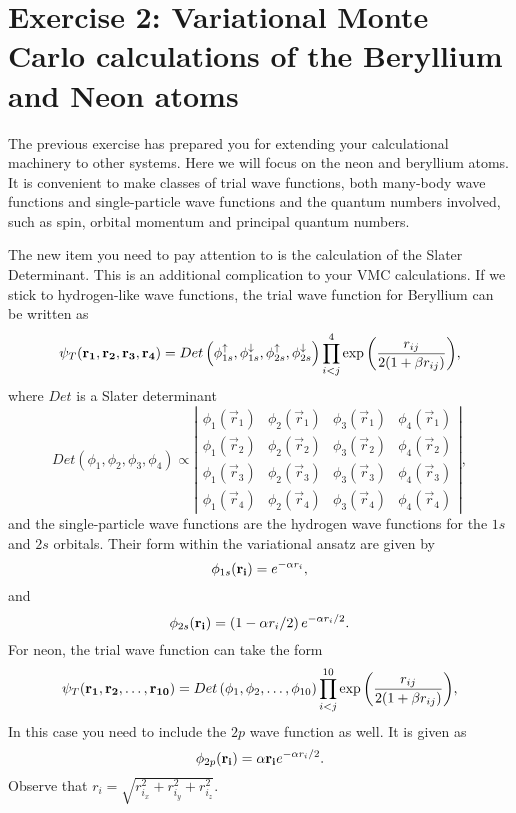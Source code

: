 
\section*{Exercise 2: Variational Monte Carlo calculations of the Beryllium and  Neon atoms}
The previous exercise has prepared you for extending your calculational machinery to other systems. Here we will focus on the neon and beryllium atoms. It is convenient to make classes of trial wave functions, both many-body wave functions and single-particle wave functions and the quantum numbers involved, such as spin, orbital momentum and principal quantum numbers.

The new item you need to pay attention to is the calculation of the Slater Determinant. This is an additional complication to your VMC calculations. If we stick to hydrogen-like wave functions, the trial wave function for Beryllium can be written as 
\begin{equation}
   \psi_{T}({\bf r_1},{\bf r_2}, {\bf r_3}, {\bf r_4}) = 
   Det\left(
   \phi_{1s}^\uparrow, \phi_{1s}^\downarrow,
   \phi_{2s}^\uparrow, \phi_{2s}^\downarrow
   \right)
   \prod_{i<j}^{4}\exp{\left(\frac{r_{ij}}{2(1+\beta r_{ij})}\right)}, 
\end{equation}
where $Det$ is a Slater determinant
\begin{equation}
   Det\left(
   \phi_{1}, \phi_{2},
   \phi_{3}, \phi_{4}
   \right)
    \propto 
    \left| \begin{matrix} 
      \phi_1(\vec{r}_1) & \phi_2(\vec{r}_1) & \phi_3(\vec{r}_1) & \phi_4(\vec{r}_1) \\ 
      \phi_1(\vec{r}_2) & \phi_2(\vec{r}_2) & \phi_3(\vec{r}_2) & \phi_4(\vec{r}_2) \\ 
      \phi_1(\vec{r}_3) & \phi_2(\vec{r}_3) & \phi_3(\vec{r}_3) & \phi_4(\vec{r}_3) \\ 
      \phi_1(\vec{r}_4) & \phi_2(\vec{r}_4) & \phi_3(\vec{r}_4) & \phi_4(\vec{r}_4)
    \end{matrix} \right|,
\end{equation}
and the single-particle wave functions are the hydrogen wave functions for the $1s$ and $2s$ orbitals. Their form within the variational ansatz are given by
\begin{equation}
\phi_{1s}({\bf r_i}) = e^{-\alpha r_i},
\end{equation}
and 
\begin{equation}
\phi_{2s}({\bf r_i}) = \left(1-\alpha r_i/2\right)e^{-\alpha r_i/2}.
\end{equation}
For neon, the trial wave function can take the form
\begin{equation}
   \psi_{T}({\bf r_1},{\bf r_2}, \dots,{\bf r_{10}}) = 
   Det\left(\phi_{1},\phi_{2},
   \dots,\phi_{10}\right)
   \prod_{i<j}^{10}\exp{\left(\frac{r_{ij}}{2(1+\beta r_{ij})}\right)}, 
\end{equation}
In this case you need to include the $2p$ wave function as well.
It is given as
\begin{equation} 
\phi_{2p}({\bf r_i}) = \alpha {\bf r_i}e^{-\alpha r_i/2}.
\end{equation}
Observe that $r_i = \sqrt{r_{i_x}^2+r_{i_y}^2+r_{i_z}^2}$.

